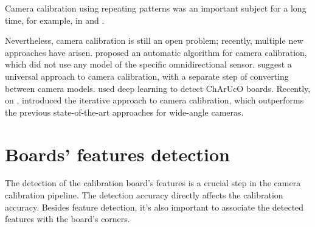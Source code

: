 Camera calibration using repeating patterns was an important subject for a long
time, for example, \cite{schaffalitzkyGeometricGroupingRepeated1998} in
\citeyear{schaffalitzkyGeometricGroupingRepeated1998} and
\cite{zhangFlexibleNewTechnique2000}.


Nevertheless, camera calibration is still an open problem; recently,
multiple new approaches have arisen.
\cite{scaramuzzaToolboxEasilyCalibrating2006} proposed an automatic algorithm
for camera calibration, which did not use any model of the specific omnidirectional
sensor.
\cite{lochmanBabelCalibUniversalApproach2021} suggest a universal approach
to camera calibration, with a separate step of converting between camera models.
\cite{huDeepChArUcoDark2019} used deep learning to detect ChArUcO boards.
Recently, on ,
\cite{duisterhofTartanCalibIterativeWideAngle2022} introduced the iterative
approach to camera calibration, which outperforms the previous state-of-the-art
approaches for wide-angle cameras.


\section{Boards' features detection}\label{sec:boards_features_detection}

The detection of the calibration board's features is a crucial step in the
camera calibration pipeline. The detection accuracy directly affects the
calibration accuracy. Besides feature detection, it's also important to
associate the detected features with the board's corners.

